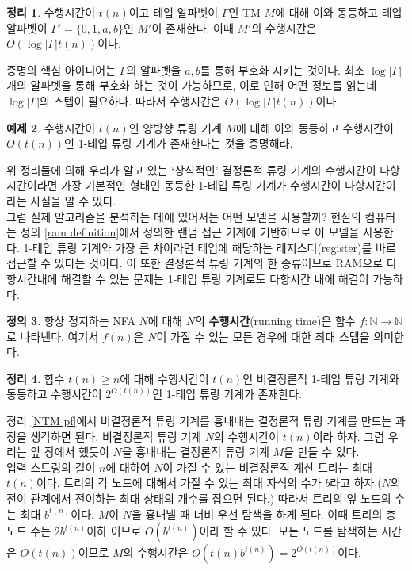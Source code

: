 \documentclass[b5paper, 10pt]{book}
\theoremstyle{definition}
\newtheorem{defn}{정의}[chapter]
\newtheorem{thm}[defn]{정리}
\newtheorem{ex}[defn]{예제}
\newenvironment{pf*}{\pushQED{\qed}\pf}{\popQED\endpf}
\begin{document}
\begin{thm}
    수행시간이 $t(n)$이고 테입 알파벳이 $\Gamma$인 TM $M$에 대해 이와 동등하고 테입 알파벳이 $\Gamma' =
     \{0,1,a,b\}$인 
    $M'$이 존재한다. 이때 $M'$의 수행시간은 $O(\log\vert\Gamma\vert t(n))$이다. 
\end{thm}
\begin{pf*}
    증명의 핵심 아이디어는 $\Gamma$의 알파벳을 $a, b$를 통해 부호화 시키는 것이다. 최소 $\log
    \vert\Gamma\vert$개의 알파벳을 통해 부호화 하는 것이 가능하므로, 이로 인해 어떤 정보를 읽는데
    $\log\vert\Gamma\vert$의 스텝이 필요하다. 따라서 수행시간은 $O(\log\vert\Gamma\vert t(n))$이다.
\end{pf*}
\begin{ex}
    수행시간이 $t(n)$인 양방향 튜링 기계 $M$에 대해 이와 
    동등하고 수행시간이 $O(t(n))$인 1-테입 튜링 기계가 존재한다는 것을 증명해라.
\end{ex}
위 정리들에 의해 우리가 알고 있는 `상식적인' 결정론적 튜링 기계의 수행시간이 다항시간이라면 
가장 기본적인 형태인 동등한 1-테입 튜링 기계가 수행시간이 다항시간이라는 사실을 알 수 있다.\\ 
그럼 실제 알고리즘을 분석하는 데에 있어서는 어떤 모델을 사용할까? 현실의 컴퓨터는 정의 \ref{ram definition}에서 
정의한 랜덤 접근 기계에 기반하므로 이 모델을 사용한다. 1-테입 튜링 기계와 가장 큰 차이라면
테입에 해당하는 레지스터(register)를 바로 접근할 수 있다는 것이다. 이 또한 결정론적 튜링 기계의 한 종류이므로
RAM으로 다항시간내에 해결할 수 있는 문제는 1-테입 튜링 기계로도 다항시간 내에 해결이 가능하다.
\begin{defn}
    항상 정지하는 NFA $N$에 대해 $N$의 \textbf{수행시간}(running time)은 함수 $f:
    \mathbb{N}\rightarrow \mathbb{N}$로 나타낸다. 여기서 $f(n)$은 $N$이 가질 수 있는
    모든 경우에 대한 최대 스텝을 의미한다. 
\end{defn}
\begin{thm}
    함수 $t(n) \ge n$에 대해 수행시간이 $t(n)$인 비결정론적 1-테입 튜링 기계와 동등하고
    수행시간이 $2^{O(t(n))}$인 1-테입 튜링 기계가 존재한다. 
\end{thm}
\begin{pf*}
    정리 \ref{NTM pf}에서 비결정론적 튜링 기계를 흉내내는 결정론적 튜링 기계를 만드는 과정을
    생각하면 된다. 비결정론적 튜링 기계 $N$의 수행시간이 $t(n)$이라 하자. 그럼 우리는 앞 장에서 했듯이
    $N$을 흉내내는 결정론적 튜링 기계 $M$을 만들 수 있다. \\ 
    입력 스트링의 길이 $n$에 대하여 $N$이 가질 수 있는 비결정론적 계산 트리는 최대 $t(n)$이다. 트리의 
    각 노드에 대해서 가질 수 있는 최대 자식의 수가 $b$라고 하자.($N$의 전이 관계에서 전이하는 최대 상태의 개수를
    잡으면 된다.) 따라서 트리의 잎 노드의 수는 최대 $b^{t(n)}$이다. $M$이 $N$을 흉내낼 때 너비 우선 탐색을 하게 
    된다. 이때 트리의 총 노드 수는 $2b^{t(n)}$이하 이므로 $O(b^{t(n)})$이라 할 수 있다. 모든 노드를
    탐색하는 시간은 $O(t(n))$이므로 $M$의 수행시간은 $O(t(n)b^{t(n)}) = 2^{O(t(n))}$이다. 
\end{pf*}
\end{document}
